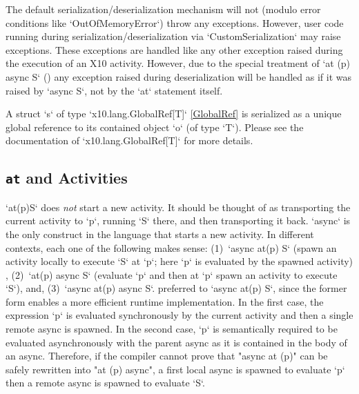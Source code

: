 The default serialization/deserialization mechanism will not (modulo
error conditions like \xcd`OutOfMemoryError`) throw any exceptions. However,
user code running during serialization/deserialization via
\xcd`CustomSerialization` may raise exceptions.  These exceptions are
handled like any other exception raised during the execution of an X10
activity.  However, due to the special treatment of \xcd`at (p) async S` 
() any exception raised during
deserialization will be handled as if it was raised by \xcd`async S`,
not by the \xcd`at` statement itself.


A struct \xcd`s` of type \xcd`x10.lang.GlobalRef[T]` \ref{GlobalRef}
is serialized as a unique global reference to its contained object
\xcd`o` (of type \xcd`T`).  Please see the documentation
of \xcd`x10.lang.GlobalRef[T]` for more details.



\subsection{{\tt at} and Activities}
\xcd`at(p)S` 
does {\em not} start a new activity.  It should be thought of as
transporting the current activity to \xcd`p`, running \xcd`S` there, and then
transporting it back.  \xcd`async` is the only construct in the
language that starts a new activity. In different contexts, each one
of the following makes sense:
(1)~\xcd`async at(p) S` 
(spawn an activity locally to execute \xcd`S` at
\xcd`p`; here \xcd`p` is evaluated by the spawned activity) , 
(2)~\xcd`at(p) async S` 
(evaluate \xcd`p` and then at \xcd`p` spawn an
activity to execute \xcd`S`), and,
(3)~\xcd`async at(p) async S`. 
preferred to \xcd`async at(p) S`, since the former form enables a more
efficient runtime implementation.  In the first case, the expression
\xcd`p` is evaluated synchronously by the current activity and then a
single remote async is spawned.  In the second case, \xcd`p` is
semantically required to be evaluated asynchronously with the parent
async as it is contained in the body of an async.  Therefore, if the
compiler cannot prove that "async at (p)" can be safely rewritten into
"at (p) async", a first local async is spawned to evaluate \xcd`p`
then a remote async is spawned to evaluate \xcd`S`.

